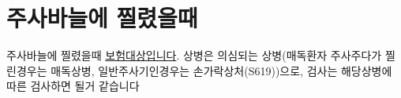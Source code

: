 \section{주사바늘에 찔렸을때}
{
주사바늘에 찔렸을때 \uline{보험대상입니다}. 상병은 의심되는 상병(매독환자 주사주다가 찔린경우는 매독상병, 일반주사기인경우는 손가락상처(S619))으로, 검사는 해당상병에 따른 검사하면 될거 같습니다
}